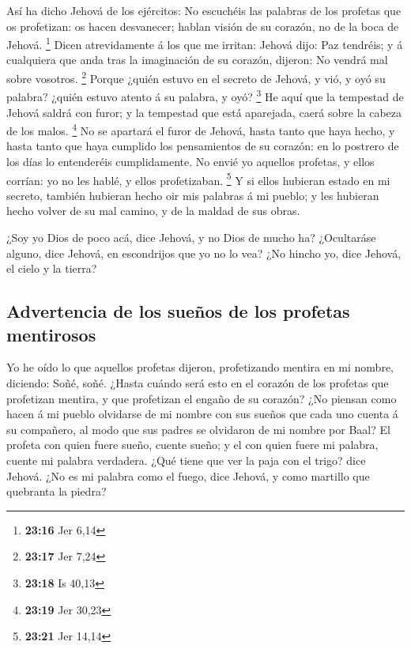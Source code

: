  Así ha dicho Jehová de los ejércitos: No escuchéis las
palabras de los profetas que os profetizan: os hacen desvanecer; hablan
visión de su corazón, no de la boca de Jehová. \footnote{\textbf{23:16}
  Jer 6,14}  Dicen atrevidamente á los que me irritan:
Jehová dijo: Paz tendréis; y á cualquiera que anda tras la imaginación
de su corazón, dijeron: No vendrá mal sobre vosotros. \footnote{\textbf{23:17}
  Jer 7,24}  Porque ¿quién estuvo en el secreto de Jehová,
y vió, y oyó su palabra? ¿quién estuvo atento á su palabra, y oyó?
\footnote{\textbf{23:18} Is 40,13}  He aquí que la
tempestad de Jehová saldrá con furor; y la tempestad que está aparejada,
caerá sobre la cabeza de los malos. \footnote{\textbf{23:19} Jer 30,23}
 No se apartará el furor de Jehová, hasta tanto que haya
hecho, y hasta tanto que haya cumplido los pensamientos de su corazón:
en lo postrero de los días lo entenderéis cumplidamente. 
No envié yo aquellos profetas, y ellos corrían: yo no les hablé, y ellos
profetizaban. \footnote{\textbf{23:21} Jer 14,14}  Y si
ellos hubieran estado en mi secreto, también hubieran hecho oir mis
palabras á mi pueblo; y les hubieran hecho volver de su mal camino, y de
la maldad de sus obras.

 ¿Soy yo Dios de poco acá, dice Jehová, y no Dios de mucho
ha?  ¿Ocultaráse alguno, dice Jehová, en escondrijos que yo
no lo vea? ¿No hincho yo, dice Jehová, el cielo y la tierra?

\hypertarget{advertencia-de-los-sueuxf1os-de-los-profetas-mentirosos}{%
\subsection{Advertencia de los sueños de los profetas
mentirosos}\label{advertencia-de-los-sueuxf1os-de-los-profetas-mentirosos}}

 Yo he oído lo que aquellos profetas dijeron, profetizando
mentira en mi nombre, diciendo: Soñé, soñé.  ¿Hasta cuándo
será esto en el corazón de los profetas que profetizan mentira, y que
profetizan el engaño de su corazón?  ¿No piensan como hacen
á mi pueblo olvidarse de mi nombre con sus sueños que cada uno cuenta á
su compañero, al modo que sus padres se olvidaron de mi nombre por Baal?
 El profeta con quien fuere sueño, cuente sueño; y el con
quien fuere mi palabra, cuente mi palabra verdadera. ¿Qué tiene que ver
la paja con el trigo? dice Jehová.  ¿No es mi palabra como
el fuego, dice Jehová, y como martillo que quebranta la piedra?

